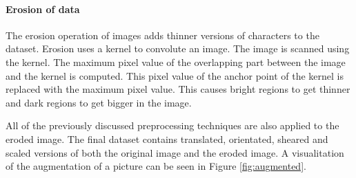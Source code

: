 \documentclass{article}
\begin{document}
\paragraph{Erosion of data}
The erosion operation of images adds thinner versions of characters to the dataset. Erosion uses a kernel to convolute an image.
The image is scanned using the kernel. The maximum pixel value of the overlapping part between the image and the kernel is computed. This pixel value of the anchor point of the kernel is replaced with the maximum pixel value.
This causes bright regions to get thinner and dark regions to get bigger in the image.

All of the previously discussed preprocessing techniques are also applied to the eroded image. The final dataset contains translated, orientated, sheared and scaled versions of both the original image and the eroded image. A visualitation of the augmentation of a picture can be seen in Figure \ref{fig:augmented}.
\end{document}

